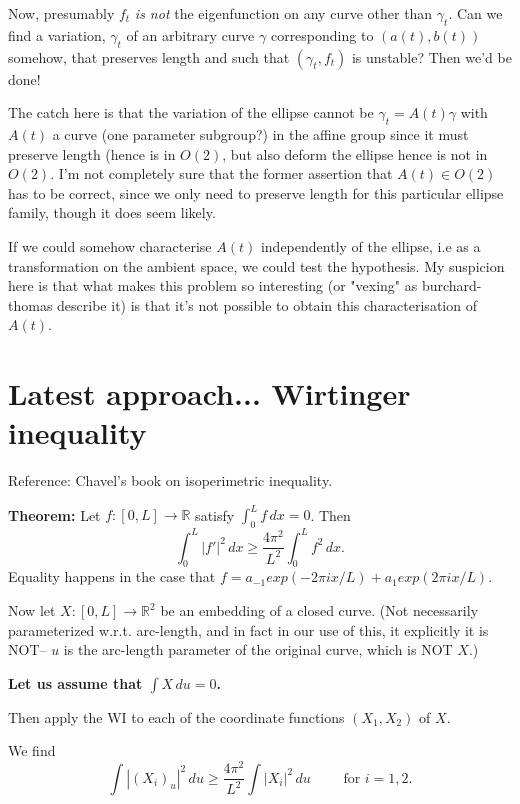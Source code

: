 \documentclass{amsart}
\begin{document}
Now, presumably \(f_t\) \emph{is not} the eigenfunction on any curve other than \(\gamma_t\). Can we find a variation, \(\gamma_t\) of an arbitrary curve \(\gamma\) corresponding to \((a(t), b(t))\) somehow, that preserves length and such that \((\gamma_t, f_t)\) is unstable? Then we'd be done!



The catch here is that the variation of the ellipse cannot be \(\gamma_t = A(t) \gamma\) with \(A(t)\) a curve (one parameter subgroup?) in the affine group since it must preserve length (hence is in \(O(2)\), but also deform the ellipse hence is not in \(O(2)\). I'm not completely sure that the former assertion that \(A(t) \in O(2)\) has to be correct, since we only need to preserve length for this particular ellipse family, though it does seem likely.

If we could somehow characterise \(A(t)\) independently of the ellipse, i.e as a transformation on the ambient space, we could test the hypothesis. My suspicion here is that what makes this problem so interesting (or "vexing" as burchard-thomas describe it) is that it's not possible to obtain this characterisation of \(A(t)\).

\section*{Latest approach... Wirtinger inequality}

Reference:  Chavel's book on isoperimetric inequality.   

\bigskip
\textbf{Theorem:} Let $f:[0,L]\rightarrow \mathbb{R}$ satisfy $\int_0^L f\,dx=0$.   Then 
\[\int_0^L |f'|^2 \,dx\ge \frac{4\pi^2}{L^2}\int_0^L f^2\,dx.\tag{WI}\]
Equality happens in the case that $f=a_{-1}exp(-2\pi i x/L)+ a_{1}exp(2\pi i x/L).$

\bigskip

Now let $X:[0,L]\rightarrow \mathbb{R}^2$ be an embedding of a closed curve.  (Not necessarily parameterized w.r.t. arc-length, and in fact in our use of this, it explicitly it is NOT-- $u$ is the arc-length parameter of the original curve, which is NOT $X$.)

\textbf{Let us assume that $\int X \,du =0$. }  

Then apply the WI to each of the coordinate functions $(X_1,X_2)$ of $X$.   

We find
\[ \int |(X_i)_u|^2 \,du \ge \frac{4\pi^2}{L^2}\int |X_i|^2\,du  \quad\quad \text{ for }i=1,2.\]
\end{document}
